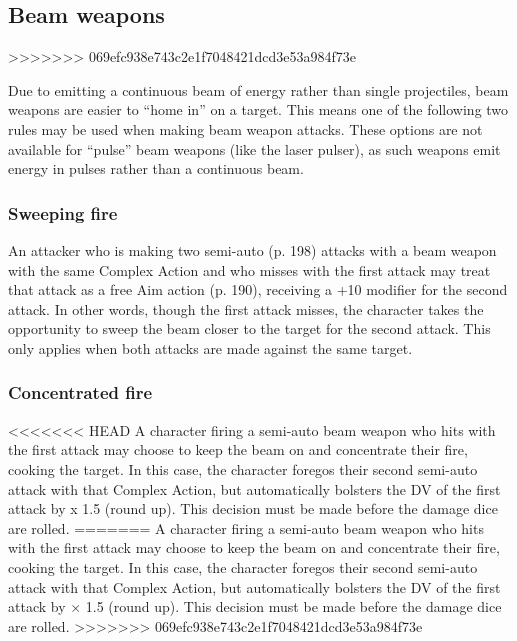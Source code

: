 \subsection{Beam weapons} \label{sec:combat-beam-weapons} >>>>>>> 069efc938e743c2e1f7048421dcd3e53a984f73e 

Due to emitting a continuous beam of energy rather than single projectiles, beam weapons are easier to ``home in'' on a target. This means one of the following two rules may be used when making beam weapon attacks. These options are not available for ``pulse'' beam weapons (like the laser pulser), as such weapons emit energy in pulses rather than a continuous beam. 

\subsubsection{Sweeping fire} 

An attacker who is making two semi-auto (p. 198) attacks with a beam weapon with the same Complex Action and who misses with the first attack may treat that attack as a free Aim action (p. 190), receiving a +10 modifier for the second attack. In other words, though the first attack misses, the character takes the opportunity to sweep the beam closer to the target for the second attack. This only applies when both attacks are made against the same target. 

\subsubsection{Concentrated fire} 

<<<<<<< HEAD A character firing a semi-auto beam weapon who hits with the first attack may choose to keep the beam on and concentrate their fire, cooking the target. In this case, the character foregos their second semi-auto attack with that Complex Action, but automatically bolsters the DV of the first attack by x 1.5 (round up). This decision must be made before the damage dice are rolled. ======= A character firing a semi-auto beam weapon who hits with the first attack may choose to keep the beam on and concentrate their fire, cooking the target. In this case, the character foregos their second semi-auto attack with that Complex Action, but automatically bolsters the DV of the first attack by $\times$ 1.5 (round up). This decision must be made before the damage dice are rolled. >>>>>>> 069efc938e743c2e1f7048421dcd3e53a984f73e 



